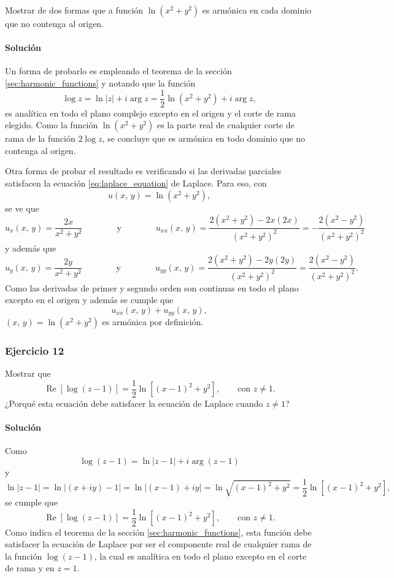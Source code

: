 \documentclass[a4paper]{report}
\renewcommand{\Re}{\operatorname{Re}}
\begin{document}
Mostrar de dos formas que a función \(\ln(x^2+y^2)\) es armónica en cada dominio que no contenga al origen.

\paragraph{Solución} Un forma de probarlo es empleando el teorema de la sección \ref{sec:harmonic_functions} y notando que la función
\[
 \log z=\ln|z|+i\arg z=\frac{1}{2}\ln(x^2+y^2)+i\arg z,
\]
es analítica en todo el plano complejo excepto en el origen y el corte de rama elegido. Como la función \(\ln(x^2+y^2)\) es la parte real de cualquier corte de rama de la función \(2\log z\), se concluye que es armónica en todo dominio que no contenga al origen. 

Otra forma de probar el resultado es verificando si las derivadas parciales satisfacen la ecuación \ref{eq:laplace_equation} de Laplace. Para eso, con 
\[
 u(x,\,y)=\ln(x^2+y^2),
\]
se ve que 
\[
 u_x(x,\,y)=\frac{2x}{x^2+y^2}
 \qquad\qquad\textrm{y}\qquad\qquad 
 u_{xx}(x,\,y)=\frac{2(x^2+y^2)-2x(2x)}{(x^2+y^2)^2}=-\frac{2(x^2-y^2)}{(x^2+y^2)^2}
\]
y además que 
\[
 u_y(x,\,y)=\frac{2y}{x^2+y^2}
 \qquad\qquad\textrm{y}\qquad\qquad 
 u_{yy}(x,\,y)=\frac{2(x^2+y^2)-2y(2y)}{(x^2+y^2)^2}=\frac{2(x^2-y^2)}{(x^2+y^2)^2}.
\]
Como las derivadas de primer y segundo orden son continuas en todo el plano excepto en el origen  y además se cumple que 
\[
 u_{xx}(x,\,y)+u_{yy}(x,\,y),
\]
\((x,\,y)=\ln(x^2+y^2)\) es armónica por definición.

\subsubsection{Ejercicio 12}

Mostrar que 
\[
 \Re[\log(z-1)]=\frac{1}{2}\ln[(x-1)^2+y^2],\qquad\textrm{con }z\neq1.
\]
¿Porqué esta ecuación debe satisfacer la ecuación de Laplace cuando \(z\neq1\)?

\paragraph{Solución} Como
\[
 \log(z-1)=\ln|z-1|+i\arg(z-1)
\]
y
\[
 \ln|z-1|=\ln|(x+iy)-1|=\ln|(x-1)+iy|=\ln\sqrt{(x-1)^2+y^2}=\frac{1}{2}\ln[(x-1)^2+y^2],
\]
se cumple que 
\[
 \Re[\log(z-1)]=\frac{1}{2}\ln[(x-1)^2+y^2],\qquad\textrm{con }z\neq1.
\]
Como indica el teorema de la sección \ref{sec:harmonic_functions}, esta función debe satisfacer la ecuación de Laplace por ser el componente real de cualquier rama de la función \(\log(z-1)\), la cual es analítica en todo el plano excepto en el corte de rama y en \(z=1\).
\end{document}
